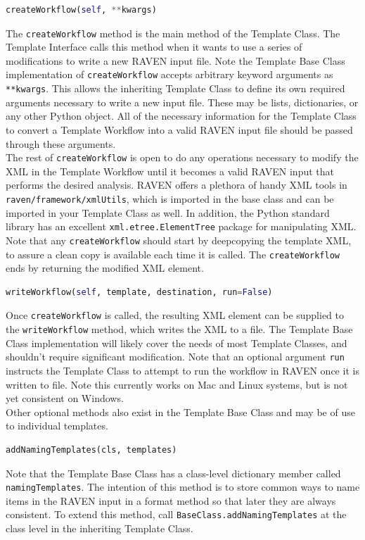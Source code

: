 \begin{lstlisting}[language=python]
 createWorkflow(self, **kwargs)
\end{lstlisting}
The \texttt{createWorkflow} method is the main method of the Template Class. The Template Interface calls this method when it wants to use a series of modifications to write a new RAVEN input file. Note the Template Base Class implementation of \texttt{createWorkflow} accepts arbitrary keyword arguments as \texttt{**kwargs}. This allows the inheriting Template Class to define its own required arguments necessary to write a new input file. These may be lists, dictionaries, or any other Python object. All of the necessary information for the Template Class to convert a Template Workflow into a valid RAVEN input file should be passed through these arguments.
\\

The rest of \texttt{createWorkflow} is open to do any operations necessary to modify the XML in the Template Workflow until it becomes a valid RAVEN input that performs the desired analysis. RAVEN offers a plethora of handy XML tools in
\texttt{raven/framework/xmlUtils}, which is imported in the base class and can be imported in your Template Class as well. In addition, the Python standard library has an excellent \texttt{xml.etree.ElementTree} package for manipulating XML.  Note that any \texttt{createWorkflow} should start by deepcopying the template XML, to assure a clean copy is available each time it is called. The \texttt{createWorkflow} ends by returning the modified XML element.

\begin{lstlisting}[language=python]
 writeWorkflow(self, template, destination, run=False)
\end{lstlisting}
Once \texttt{createWorkflow} is called, the resulting XML element can be supplied to the \texttt{writeWorkflow} method, which writes the XML to a file. The Template Base Class implementation will likely cover the needs of most Template Classes, and shouldn't require significant modification. Note that an optional argument \texttt{run} instructs the Template Class to attempt to run the workflow in RAVEN once it is written to file. Note this currently works on Mac
and Linux systems, but is not yet consistent on Windows.
\\

Other optional methods also exist in the Template Base Class and may be of use to individual templates.
\begin{lstlisting}[language=python]
 addNamingTemplates(cls, templates)
\end{lstlisting}
Note that the Template Base Class has a class-level dictionary member called \texttt{namingTemplates}. The intention of this method is to store common ways to name items in the RAVEN input in a format method so that later they are always consistent. To extend this method, call \texttt{BaseClass.addNamingTemplates} at the class level in the inheriting Template Class.
\\

